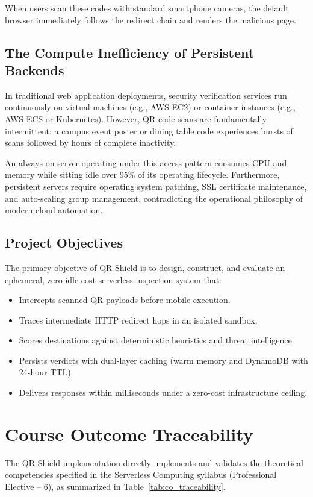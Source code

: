 \documentclass[12pt,a4paper]{report}
\begin{document}
When users scan these codes with standard smartphone cameras, the default browser immediately follows the redirect chain and renders the malicious page.

\section{The Compute Inefficiency of Persistent Backends}
In traditional web application deployments, security verification services run continuously on virtual machines (e.g., AWS EC2) or container instances (e.g., AWS ECS or Kubernetes). However, QR code scans are fundamentally intermittent: a campus event poster or dining table code experiences bursts of scans followed by hours of complete inactivity. 

An always-on server operating under this access pattern consumes CPU and memory while sitting idle over 95\% of its operating lifecycle. Furthermore, persistent servers require operating system patching, SSL certificate maintenance, and auto-scaling group management, contradicting the operational philosophy of modern cloud automation.

\section{Project Objectives}
The primary objective of QR-Shield is to design, construct, and evaluate an ephemeral, zero-idle-cost serverless inspection system that:
\begin{itemize}
    \item Intercepts scanned QR payloads before mobile execution.
    \item Traces intermediate HTTP redirect hops in an isolated sandbox.
    \item Scores destinations against deterministic heuristics and threat intelligence.
    \item Persists verdicts with dual-layer caching (warm memory and DynamoDB with 24-hour TTL).
    \item Delivers responses within milliseconds under a zero-cost infrastructure ceiling.
\end{itemize}

\chapter{Course Outcome Traceability}

The QR-Shield implementation directly implements and validates the theoretical competencies specified in the Serverless Computing syllabus (Professional Elective -- 6), as summarized in Table~\ref{tab:co_traceability}.
\end{document}
